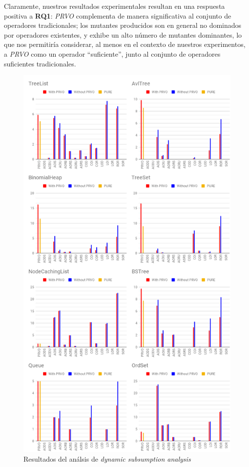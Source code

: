 Claramente, nuestros resultados experimentales resultan en una respuesta positiva a \textbf{RQ1}: \emph{PRVO} complementa de manera significativa al conjunto de operadores tradicionales; los mutantes producidos son en general no dominados por operadores existentes, y exhibe un alto n\'umero de mutantes dominantes, lo que nos permitir\'ia considerar, al menos en el contexto de nuestros experimentos, a \emph{PRVO} como un operador ``suficiente'', junto al conjunto de operadores suficientes tradicionales.

\begin{figure}[t]
	\begin{center}
		\includegraphics[width=12cm]{figures/Tables.png}
	\end{center}
	\caption{Resultados del an\'alsis de \emph{dynamic subsumption analysis}}
	\label{subsumption-results}
\end{figure}

